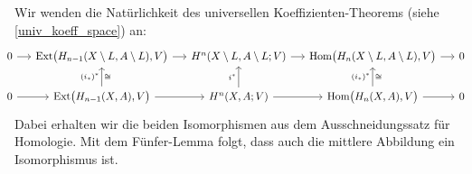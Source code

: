 \begin{beweis}[name={\cite[S. 199 ff]{Hatcher}}]
\begin{enumerate}[(i)]
		Wir wenden die Natürlichkeit des universellen Koeffizienten-Theorems (siehe \autoref{univ_koeff_space}) an:
		\[
			\hspace{-1.2em}\begin{tikzcd}[column sep=1.3em]
				0 \rar & \Ext \enbrace[\big]{H_{n-1}(X\setminus L,A \setminus L),V} \rar & H^n(X\setminus L,A \setminus L;V) \rar & \Hom \enbrace[\big]{H_n(X \setminus L,A\setminus L),V} \rar & 0 \\
				0 \rar & \Ext \enbrace[\big]{H_{n-1}(X,A),V} \rar \uar["(i_*)^*","\cong"'] & H^n(X,A;V) \uar["i^*"] \rar & \Hom \enbrace[\big]{H_n(X,A),V} \rar \uar["(i_*)^*","\cong"'] & 0 
			\end{tikzcd}
		\]
		Dabei erhalten wir die beiden Isomorphismen aus dem Ausschneidungssatz für Homologie.
		Mit dem Fünfer-Lemma folgt, dass auch die mittlere Abbildung ein Isomorphismus ist.\qedhere
	\end{enumerate}
\end{beweis}

